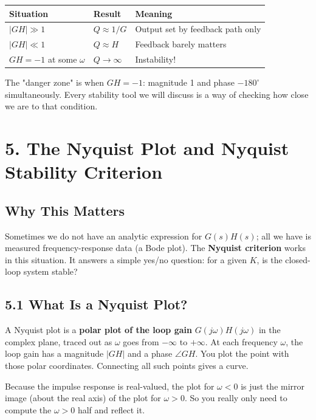 \documentclass[11pt]{article}
\begin{document}
\begin{center}
\begin{tabular}{|l|l|l|}
\hline
\textbf{Situation} & \textbf{Result} & \textbf{Meaning} \\
\hline
$\lvert GH \rvert \gg 1$ & $Q \approx 1/G$ & Output set by feedback path only \\
\hline
$\lvert GH \rvert \ll 1$ & $Q \approx H$ & Feedback barely matters \\
\hline
$GH = -1$ at some $\omega$ & $Q \to \infty$ & Instability! \\
\hline
\end{tabular}
\end{center}

The "danger zone" is when $GH = -1$: magnitude 1 and phase $-180^\circ$ simultaneously. Every stability tool we will discuss is a way of checking how close we are to that condition.

\section*{5. The Nyquist Plot and Nyquist Stability Criterion}

\subsection*{Why This Matters}

Sometimes we do not have an analytic expression for $G(s)H(s)$; all we have is measured frequency-response data (a Bode plot). The \textbf{Nyquist criterion} works in this situation. It answers a simple yes/no question: for a given $K$, is the closed-loop system stable?

\subsection*{5.1 What Is a Nyquist Plot?}

A Nyquist plot is a \textbf{polar plot of the loop gain} $G(j\omega)H(j\omega)$ in the complex plane, traced out as $\omega$ goes from $-\infty$ to $+\infty$. At each frequency $\omega$, the loop gain has a magnitude $\lvert GH \rvert$ and a phase $\angle GH$. You plot the point with those polar coordinates. Connecting all such points gives a curve.

Because the impulse response is real-valued, the plot for $\omega < 0$ is just the mirror image (about the real axis) of the plot for $\omega > 0$. So you really only need to compute the $\omega > 0$ half and reflect it.
\end{document}
